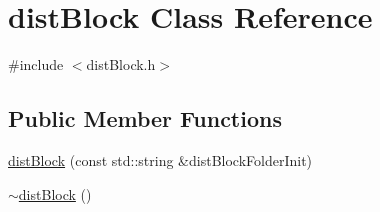 \hypertarget{classdistBlock}{\section{dist\-Block \-Class \-Reference}
\label{classdistBlock}
}


{\ttfamily \#include $<$dist\-Block.\-h$>$}

\subsection*{\-Public \-Member \-Functions}
\begin{DoxyCompactItemize}
\item 
\hyperlink{classdistBlock_ad112dfd0b69a9718dbed361c089a3688}{dist\-Block} (const std\-::string \&dist\-Block\-Folder\-Init)
\item 
\hypertarget{classdistBlock_a67fac7fe21f41c2572671f53aacedf7c}{\hyperlink{classdistBlock_a67fac7fe21f41c2572671f53aacedf7c}{$\sim$dist\-Block} ()}\label{classdistBlock_a67fac7fe21f41c2572671f53aacedf7c}


\end{DoxyCompactItemize}
